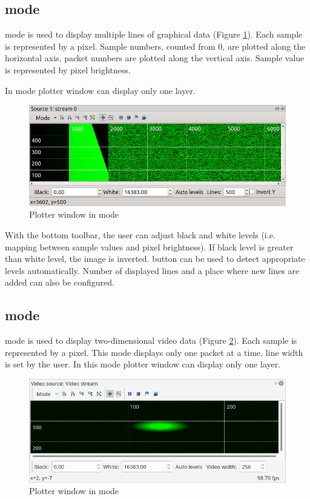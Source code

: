 \documentclass[a4paper,12pt,twoside,extrafontsizes]{memoir}
\begin{document}
\subsection{ mode}

 mode is used to display multiple lines of graphical data (Figure \ref{fig:plotterbitmap}). Each sample is represented by a pixel. Sample numbers, counted from 0, are plotted along the horizontal axis, packet numbers are plotted along the vertical axis. Sample value is represented by pixel brightness.

In  mode plotter window can display only one layer.

\begin{figure}[htbp]
\centering
\includegraphics[scale=0.8]{images/plotterbitmap.png}
\caption{Plotter window in  mode}
\label{fig:plotterbitmap}
\end{figure}

With the bottom toolbar, the user can adjust black and white levels (i.e. mapping between sample values and pixel brightness). If black level is greater than white level, the image is inverted.  button can be used to detect appropriate levels automatically. Number of displayed lines and a place where new lines are added can also be configured.

\subsection{ mode}

 mode is used to display two-dimensional video data (Figure \ref{fig:plottervideo}). Each sample is represented by a pixel. This mode displays only one packet at a time, line width is set by the user. In this mode plotter window can display only one layer.

\begin{figure}[htbp]
\centering
\includegraphics[scale=0.8058]{images/plottervideo.png}
\caption{Plotter window in  mode}
\label{fig:plottervideo}
\end{figure}
\end{document}
